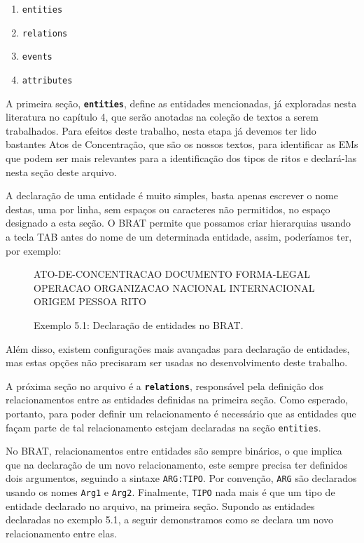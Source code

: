 \documentclass[11pt]{report}
\begin{document}
\begin{enumerate}[label={\textbf{\arabic*.}}]
  \item \texttt{entities}
  \item \texttt{relations}
  \item \texttt{events}
  \item \texttt{attributes}
\end{enumerate}

A primeira seção, \textbf{\texttt{entities}}, define as entidades mencionadas, já exploradas nesta literatura no capítulo 4, que serão anotadas na
coleção de textos a serem trabalhados. Para efeitos deste trabalho, nesta etapa já devemos ter lido bastantes Atos de Concentração, que são os nossos textos, para identificar as
EMs que podem ser mais relevantes para a identificação dos tipos de ritos e declará-las nesta seção deste arquivo.

A declaração de uma entidade é muito simples, basta apenas escrever o nome destas, uma por linha, sem espaços ou caracteres não permitidos, no espaço designado a esta seção. O BRAT
permite que possamos criar hierarquias usando a tecla TAB antes do nome de um determinada entidade, assim, poderíamos ter, por exemplo:

\begin{figure}[h!]
\centering
\begin{boxedverbatim}
[entities]

ATO-DE-CONCENTRACAO
DOCUMENTO
FORMA-LEGAL
OPERACAO
ORGANIZACAO
    NACIONAL
    INTERNACIONAL
ORIGEM
PESSOA
RITO
\end{boxedverbatim}
\caption*{Exemplo 5.1: Declaração de entidades no BRAT.}
\end{figure}

Além disso, existem configurações mais avançadas para declaração de entidades, mas estas opções não precisaram ser usadas no desenvolvimento deste trabalho.

A próxima seção no arquivo é a \textbf{\texttt{relations}}, responsável pela definição dos relacionamentos entre as entidades definidas na primeira seção. Como esperado, portanto,
para poder definir um relacionamento é necessário que as entidades que façam parte de tal relacionamento estejam declaradas na seção \texttt{entities}.

No BRAT, relacionamentos entre entidades são sempre binários, o que implica que na declaração de um novo relacionamento, este sempre precisa ter definidos dois argumentos,
seguindo a sintaxe \texttt{ARG:TIPO}. Por convenção, \texttt{ARG} são declarados usando os nomes \texttt{Arg1} e \texttt{Arg2}. Finalmente, \texttt{TIPO} nada mais é que
um tipo de entidade declarado no arquivo, na primeira seção. Supondo as entidades declaradas no exemplo 5.1, a seguir demonstramos como se declara um novo relacionamento entre elas.
\end{document}
